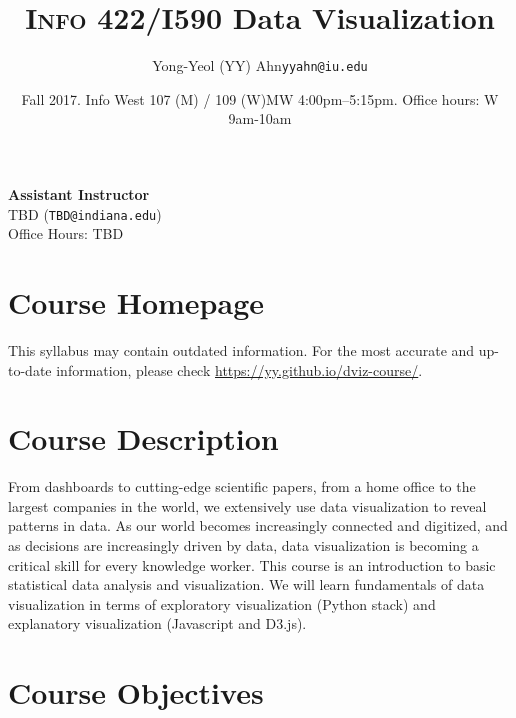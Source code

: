 \documentclass[11pt,article,oneside]{memoir}
\makeatletter
\def\myauthor{Author}
\def\mytitle{Title}
\def\myemail{yyahn@iu.edu}
\def\myauthor{Yong-Yeol (YY) Ahn}
\def\mytitle{{\normalsize \textsc{Info} 422/I590 \newline} \HUGE Data Visualization}
\makeatother
\begin{document}

\def\ind{\hangindent=1 true cm\hangafter=1 \noindent}
\def\labelitemi{$\cdot$}


\title{\LARGE \mytitle}     
\author{\Large\myauthor \newline \footnotesize\texttt{\noindent\myemail}}
\date{Fall 2017. Info West 107 (M) / 109 (W)\newline MW 4:00pm--5:15pm. \newline Office hours: W 9am-10am}

\maketitle

\vspace{-20pt}
{\bfseries Assistant Instructor} \\ TBD (\texttt{TBD@indiana.edu}) \\ Office Hours: TBD 

\section{Course Homepage}

This syllabus may contain outdated information. For the most accurate and
up-to-date information, please check \url{https://yy.github.io/dviz-course/}. 

\section{Course Description}

From dashboards to cutting-edge scientific papers, from a home office to the
largest companies in the world, we extensively use data visualization to reveal
patterns in data. As our world becomes increasingly connected and digitized,
and as decisions are increasingly driven by data, data visualization is
becoming a critical skill for every knowledge worker. This course is an
introduction to basic statistical data analysis and visualization. We will
learn fundamentals of data visualization in terms of exploratory visualization
(Python stack) and explanatory visualization (Javascript and D3.js).  


\section{Course Objectives}
\end{document}
